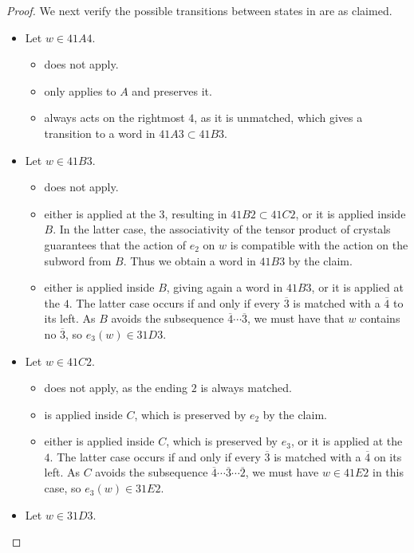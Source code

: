 \documentclass{amsart}
\theoremstyle{definition}
\theoremstyle{remark}
\numberwithin{equation}{section}
\begin{document}
\begin{proof}
We next verify the possible transitions between states in  are as claimed.
\begin{itemize}
    \item Let $w \in 41A4$.
    \begin{itemize}
        \item[$e_1$:] does not apply.
        \item[$e_2$:] only applies to $A$ and preserves it.  
        \item[$e_3$:] always acts on the rightmost $4$, as it is unmatched, which gives a transition to a word in $41A3 \subset 41B3$.
    \end{itemize}
    \item Let $w \in 41B3$.
    \begin{itemize}
        \item[$e_1$:] does not apply.
        \item[$e_2$:] either is applied at the $3$, resulting in $41B2 \subset 41C2$, or it is applied inside $B$. In the latter case, the associativity of the tensor product of crystals guarantees that the action of $e_2$ on $w$ is compatible with the action on the subword from $B$. Thus we obtain a word in $41B3$ by the claim. 
        \item[$e_3$:] either is applied inside $B$, giving again a word in $41B3$, or it is applied at the $4$. The latter case occurs if and only if every $\overline{3}$ is matched with a $\overline{4}$ to its left. As $B$ avoids the subsequence $\overline{4}\cdots\overline{3}$, we must have that $w$ contains no $\overline{3}$, so $e_3(w) \in 31D3$.
    \end{itemize}
    \item Let $w \in 41C2$.
    \begin{itemize}
        \item[$e_1$:] does not apply, as the ending $2$ is always matched.
        \item[$e_2$:] is applied inside $C$, which is preserved by $e_2$ by the claim.
        \item[$e_3$:] either is applied inside $C$, which is preserved by $e_3$, or it is applied at the $4$. The latter case occurs if and only if every $\overline{3}$ is matched with a $\overline{4}$ on its left. As $C$ avoids the subsequence $\overline{4}\cdots\overline{3}\cdots\overline{2}$, we must have $w \in 41E2$ in this case, so $e_3(w) \in 31E2$.
    \end{itemize}
    \item Let $w \in 31D3$.

\end{itemize}
\end{proof}
\end{document}
